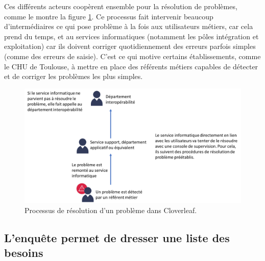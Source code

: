 			Ces différents acteurs coopèrent ensemble pour la résolution de problèmes,
			comme le montre la figure \ref{resolution_pbs}. Ce processus fait intervenir
			beaucoup d’intermédiaires ce qui pose problème à la fois aux utilisateurs métiers,
			car cela prend du temps, et au services informatiques
			(notamment les pôles intégration et exploitation) car ils doivent corriger
			quotidiennement des erreurs parfois simples (comme des erreurs de saisie).
			C'est ce qui motive certains établissements, comme le CHU de
			Toulouse, à mettre en place des référents métiers capables de détecter et
			de corriger les problèmes les plus simples.
			\begin{figure}[H]
				\centering
				\includegraphics[width=15cm]{../img/user_1.png}
				\caption{\label{resolution_pbs} Processus de résolution d'un problème dans
				Cloverleaf.}
			\end{figure}
			
		\subsection{L'enquête permet de dresser une liste des besoins}
